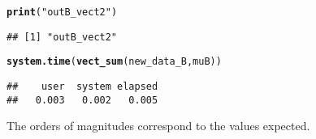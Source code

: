 \documentclass{llncs}\usepackage[]{graphicx}\usepackage[]{color}
\makeatletter
\newcommand{\hlstr}[1]{\textcolor[rgb]{0.192,0.494,0.8}{#1}}%
\newcommand{\hlstd}[1]{\textcolor[rgb]{0.345,0.345,0.345}{#1}}%
\newcommand{\hlkwd}[1]{\textcolor[rgb]{0.737,0.353,0.396}{\textbf{#1}}}%
\newenvironment{kframe}{%
 \def\at@end@of@kframe{}%
 \ifinner\ifhmode%
  \def\at@end@of@kframe{\end{minipage}}%
  \begin{minipage}{\columnwidth}%
 \fi\fi%
 \def\FrameCommand##1{\hskip\@totalleftmargin \hskip-\fboxsep
 \colorbox{shadecolor}{##1}\hskip-\fboxsep
     \hskip-\linewidth \hskip-\@totalleftmargin \hskip\columnwidth}%
 \MakeFramed {\advance\hsize-\width
   \@totalleftmargin\z@ \linewidth\hsize
   \@setminipage}}%
 {\par\unskip\endMakeFramed%
 \at@end@of@kframe}
\newenvironment{knitrout}{}{} %
\makeatother
\begin{document}
\begin{knitrout}
\begin{kframe}
\begin{alltt}
\hlkwd{print}\hlstd{(}\hlstr{"outB_vect2"}\hlstd{)}
\end{alltt}
\begin{lstlisting}[basicstyle=\ttfamily,breaklines=true]
## [1] "outB_vect2"
\end{lstlisting}
\begin{alltt}
\hlkwd{system.time}\hlstd{(}\hlkwd{vect_sum}\hlstd{(new_data_B,muB))}
\end{alltt}
\begin{lstlisting}[basicstyle=\ttfamily,breaklines=true]
##    user  system elapsed 
##   0.003   0.002   0.005
\end{lstlisting}
\end{kframe}
\end{knitrout}

\noindent
The orders of magnitudes correspond to the values expected.
\end{document}
